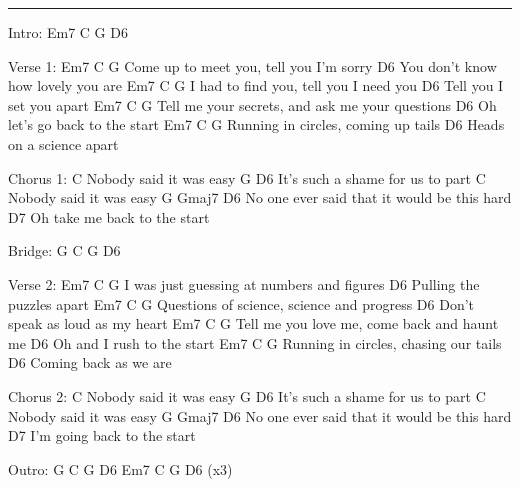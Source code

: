 \noindent\rule{\columnwidth}{1pt}

\begin{multicols}{2}
\begin{lstsong}
Intro: Em7 C G D6

Verse 1:
Em7           C                   G
Come up to meet you, tell you I'm sorry
                   D6
You don't know how lovely you are
Em7            C                    G
   I had to find you, tell you I need you
            D6
Tell you I set you apart
Em7             C                        G
  Tell me your secrets, and ask me your questions
              D6
Oh let's go back to the start
Em7           C                  G
  Running in circles, coming up tails
           D6
Heads on a science apart

Chorus 1:
C
 Nobody said it was easy
G                    D6
  It's such a shame for us to part
C
 Nobody said it was easy
G            Gmaj7                      D6
 No one ever said that it would be this hard
D7
Oh take me back to the start

Bridge:
G C G D6

Verse 2:
Em7           C                      G
I was just guessing at numbers and figures
            D6
Pulling the puzzles apart
Em7            C                   G
 Questions of science, science and progress
                D6
Don't speak as loud as my heart
Em7           C                   G
Tell me you love me, come back and haunt me
          D6
Oh and I rush to the start
Em7           C                   G
Running in circles, chasing our tails
         D6
Coming back as we are

Chorus 2:
C
  Nobody said it was easy
G                     D6
 It's such a shame for us to part
C
Nobody said it was easy
G           Gmaj7                        D6
No one ever said that it would be this hard
D7
I'm going back to the start

Outro:
G C G D6 
Em7 C G D6 (x3)
\end{lstsong}
\end{multicols}
\newpage


